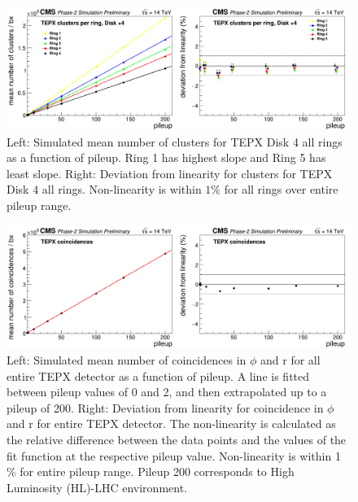 \begin{figure}[H]
  \centering
  \includegraphics[width=1\columnwidth]{./clustersperringD+4.png}
  \caption{Left: Simulated mean number of clusters for TEPX Disk 4 all rings as a function of pileup. Ring 1 has highest slope and Ring 5 has least slope. Right: Deviation from linearity for clusters for TEPX Disk 4 all rings. Non-linearity is within $1\%$ for all rings over entire pileup range.}
  \label{fig:CMS}
\end{figure}


\begin{figure}[H]
  \centering
  \includegraphics[width=1 \columnwidth]{./totalcoincidences.png}
  \caption{Left: Simulated mean number of coincidences in $\phi$ and r for all entire TEPX detector as a function of pileup. A line is fitted between pileup values of 0 and 2, and then extrapolated up to a pileup of 200. Right: Deviation from linearity for coincidence in $\phi$ and r for entire TEPX detector. The non-linearity is calculated as the relative difference between the data points and the values of the fit function at the respective pileup value. Non-linearity is within 1 \% for entire pileup range. Pileup 200 corresponds to High Luminosity (HL)-LHC environment.}
  \label{fig:CMS}
\end{figure}


